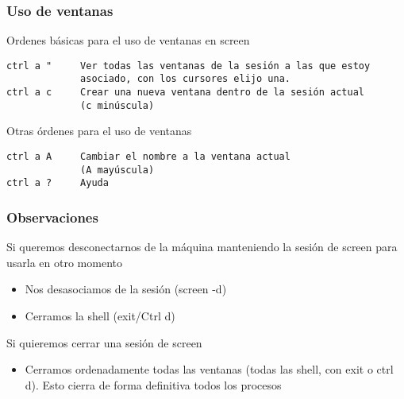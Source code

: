 \documentclass[ucs]{beamer}
\begin{document}
\begin{frame}[fragile]
\frametitle{Uso de ventanas}

Ordenes básicas para el uso de ventanas en screen
  \begin{footnotesize}
  \begin{verbatim}
ctrl a "     Ver todas las ventanas de la sesión a las que estoy 
             asociado, con los cursores elijo una.
ctrl a c     Crear una nueva ventana dentro de la sesión actual
             (c minúscula)

  \end{verbatim}
  \end{footnotesize}

Otras órdenes para el uso de ventanas
  \begin{footnotesize}
  \begin{verbatim}
ctrl a A     Cambiar el nombre a la ventana actual
             (A mayúscula)
ctrl a ?     Ayuda
  \end{verbatim}
  \end{footnotesize}

\end{frame}
\begin{frame}[fragile]
\frametitle{Observaciones}


Si queremos desconectarnos de la máquina manteniendo la sesión de screen
para usarla en otro momento
\begin{itemize}
\item
Nos desasociamos de la sesión (screen -d)
\item
Cerramos la shell (exit/Ctrl d)
\end{itemize}

Si quieremos cerrar una sesión de screen
\begin{itemize}
\item
Cerramos ordenadamente todas las ventanas (todas las shell, con exit o ctrl d).
Esto cierra de forma definitiva todos los procesos
\end{itemize}



\end{frame}
\end{document}

